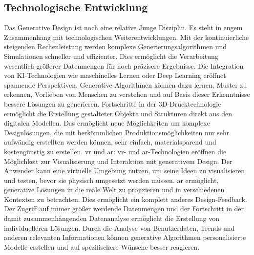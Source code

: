 \subsection*{Technologische Entwicklung}
Das Generative Design ist noch eine relative Junge Disziplin. Es steht in engem Zusammenhang mit technologischen Weiterentwicklungen. 
Mit der kontinuierliche steigenden Rechenleistung werden komplexe Generierungsalgorithmen und Simulationen schneller und effizienter. Dies ermöglicht die Verarbeitung wesentlich größerer Datenmengen für noch präzisere Ergebnisse.
Die Integration von KI-Technologien wie maschinelles Lernen oder Deep Learning eröffnet spannende Perspektiven. Generative Algorithmen können dazu lernen, Muster zu erkennen, Vorlieben von Menschen zu verstehen und auf Basis dieser Erkenntnisse bessere Lösungen zu generieren. 
Fortschritte in der 3D-Drucktechnologie ermöglicht die Erstellung gestalteter Objekte und Strukturen direkt aus den digitalen Modellen. Das ermöglicht neue Möglichkeiten um komplexe Designlösungen, die mit herkömmlichen Produktionsmöglichkeiten nur sehr aufwändig erstellten werden können, sehr einfach, materialsparend und kostengünstig zu erstellen. 
\ac*{vr} und \ac*{ar}: \ac*{vr}- und \ac*{ar}-Technologien eröffnen die Möglichkeit zur Visualisierung und Interaktion mit generativem Design. Der Anwender kann eine virtuelle Umgebung nutzen, um seine Ideen zu visualisieren und testen, bevor sie physisch umgesetzt werden müssen. \ac*{ar} ermöglicht, generative Lösungen in die reale Welt zu projizieren und in verschiedenen Kontexten zu betrachten. Dies ermöglicht ein komplett anderes Design-Feedback. 
Der Zugriff auf immer größer werdende Datenmengen und der Fortschritt in der damit zusammenhängenden Datenanalyse ermöglicht die Erstellung von individuelleren Lösungen. Durch die Analyse von Benutzerdaten, Trends und anderen relevanten Informationen können  generative Algorithmen personalisierte Modelle erstellen und auf spezifischere Wünsche besser reagieren. \autocite{10}
